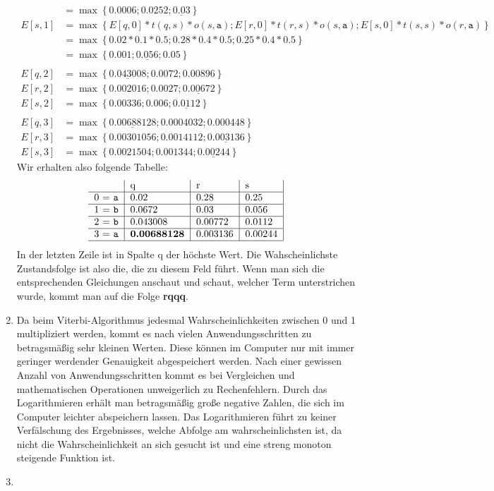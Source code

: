 \documentclass[a4paper,10pt]{article}
\begin{document}
\begin{enumerate}
\begin{align*}
			&= \max\left\{0.0006; 0.0252; \underline{0.03}\right\}\\
			E[s, 1] &= \max\left\{E[q, 0] * t(q, s) * o(s, \texttt{a}); E[r, 0] * t(r, s) * o(s, \texttt{a}); E[s, 0] * t(s, s) * o(r, \texttt{a})\right\}\\
			&= \max\left\{0.02 * 0.1 * 0.5; 0.28 * 0.4 * 0.5; 0.25 * 0.4 * 0.5\right\}\\
			&= \max\left\{0.001; \underline{0.056}; 0.05\right\}\\
			\\
			E[q, 2] &= \max\left\{\underline{0.043008}; 0.0072; 0.00896\right\}\\
			E[r, 2] &= \max\left\{0.002016; 0.0027; \underline{0.00672}\right\}\\
			E[s, 2] &= \max\left\{0.00336; 0.006; \underline{0.0112}\right\}\\
			\\
			E[q, 3] &= \max\left\{\underline{0.00688128}; 0.0004032; 0.000448\right\}\\
			E[r, 3] &= \max\left\{0.00301056; 0.0014112; \underline{0.003136}\right\}\\
			E[s, 3] &= \max\left\{0.0021504; 0.001344; \underline{0.00244}\right\}
		\end{align*}
		Wir erhalten also folgende Tabelle:\begin{align*} \begin{tabular}{ c | l | l | l | }
			 & q & r & s \\
			\hline
			0 = \texttt{a} & 0.02  & 0.28 & 0.25\\
			\hline
			1 = \texttt{b} & 0.0672 & 0.03 & 0.056\\
			\hline
			2 = \texttt{b} & 0.043008 & 0.00772 & 0.0112\\
			\hline
			3 = \texttt{a} & \textbf{0.00688128} & 0.003136 & 0.00244\\
			\hline
		\end{tabular} \end{align*}
		In der letzten Zeile ist in Spalte q der höchste Wert. Die Wahscheinlichste Zustandsfolge ist also die, die zu diesem Feld führt. Wenn man sich die entsprechenden Gleichungen anschaut und schaut, welcher Term unterstrichen wurde, kommt man auf die Folge \textbf{rqqq}.
	\item Da beim Viterbi-Algorithmus jedesmal Wahrscheinlichkeiten zwischen 0 und 1 multipliziert werden, kommt es nach vielen Anwendungsschritten zu betragsmäßig sehr kleinen Werten. Diese können im Computer nur mit immer geringer werdender Genauigkeit abgespeichert werden. Nach einer gewissen Anzahl von Anwendungsschritten kommt es bei Vergleichen und mathematischen Operationen unweigerlich zu Rechenfehlern. Durch das Logarithmieren erhält man betragsmäßig große negative Zahlen, die sich im Computer leichter abspeichern lassen. Das Logarithmieren führt zu keiner Verfälschung des Ergebnisses, welche Abfolge am wahrscheinlichsten ist, da nicht die Wahrscheinlichkeit an sich gesucht ist und eine streng monoton steigende Funktion ist.
	\item
\end{enumerate}
\end{document}
